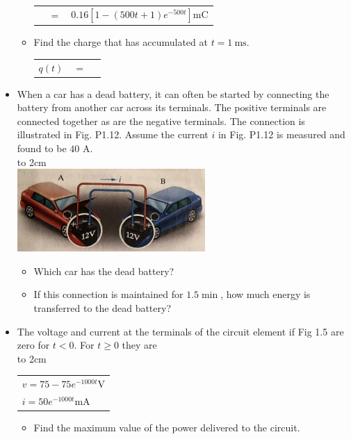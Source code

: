 \documentclass[a4paper]{article}
\newcommand\tab[1][0.5cm]{\hspace*{#1}}
\begin{document}
\begin{itemize}
\begin{itemize}
\begin{tabular}{r c l}
		      	       & $=$ & $0.16[1-(500t + 1)e^{-500t}]\si{\milli\coulomb}$                                      \\
		      \end{tabular}
		\item[b)] Find the charge that has accumulated at $t = \SI{1}{\ms}$. \\
		      \begin{tabular}{r c l}
		      	$q(t)$ & $=$ &   
		      \end{tabular}
	\end{itemize}
	\item[12] When a car has a dead battery, it can often be started by connecting the battery from another car across its terminals. The positive terminals are connected together as are the negative terminals. The connection is illustrated in Fig. P1.12. Assume the current $i$ in Fig. P1.12 is measured and found to be $40$ \si{\ampere}.\\
	      \hbox to 2cm{} \\
	      \includegraphics{P1-12.png} \\
	      \begin{itemize}
	      	\item[a)] Which car has the dead battery?
	      	\item[b)] If this connection is maintained for $1.5 \si{\min}$, how much energy is transferred to the dead battery? 
	      \end{itemize}
	\item[18] The voltage and current at the terminals of the circuit element if Fig 1.5 are zero for $t < 0$. For $t \geq 0$ they are \\
	      \hbox to 2cm{}
	      \tab\begin{tabular}{l}
	      $v = 75 - 75e^{-1000t}\si{\volt}$ \\
	      $i = 50e^{-1000t}\si{\milli\ampere}$
	\end{tabular}
	\begin{itemize}
		\item[a)] Find the maximum value of the power delivered to the circuit. \\
		      \begin{tabular}{l c c}

\end{tabular}
\end{itemize}
\end{itemize}
\end{document}
